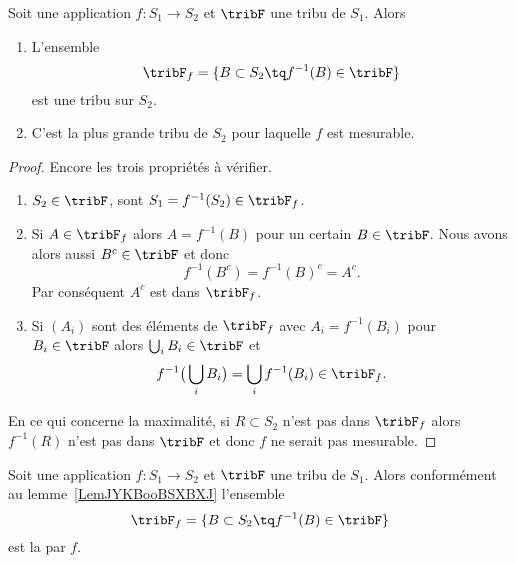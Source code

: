 \begin{lemma}       \label{LemJYKBooBSXBXJ}
    Soit une application \( f\colon S_1\to S_2\) et \( \tribF\) une tribu de \( S_1\). Alors
    \begin{enumerate}
        \item
            L'ensemble
            \begin{equation}
                \tribF_f=\{  B\subset S_2\tq f^{-1}(B)\in \tribF  \}
            \end{equation}
            est une tribu sur \( S_2\).
        \item
            C'est la plus grande tribu de \( S_2\) pour laquelle \( f\) est mesurable.
    \end{enumerate}
\end{lemma}

\begin{proof}
    Encore les trois propriétés à vérifier.
    \begin{enumerate}
        \item
            \( S_2\in\tribF\), sont \( S_1=f^{-1}(S_2)\in \tribF_f\).
        \item
            Si \( A\in \tribF_f\) alors \( A=f^{-1}(B)\) pour un certain \( B\in \tribF\). Nous avons alors aussi \( B^c\in \tribF\) et donc
            \begin{equation}
                f^{-1}(B^c)=f^{-1}(B)^c=A^c.
            \end{equation}
            Par conséquent \( A^c\) est dans \( \tribF_f\).
        \item
            Si \( (A_i)\) sont des éléments de \( \tribF_f\) avec \( A_i=f^{-1}(B_i)\) pour \( B_i\in \tribF\) alors \( \bigcup_iB_i\in\tribF\) et
            \begin{equation}
                f^{-1}\big( \bigcup_iB_i \big)=\bigcup_if^{-1}(B_i)\in\tribF_f.
            \end{equation}
    \end{enumerate}
    En ce qui concerne la maximalité, si \( R\subset S_2\) n'est pas dans \( \tribF_f\) alors \( f^{-1}(R)\) n'est pas dans \( \tribF\) et donc \( f\) ne serait pas mesurable.
\end{proof}

\begin{definition}     \label{DefNOJWooLGKhmJ}
    Soit une application \( f\colon S_1\to S_2\) et \( \tribF\) une tribu de \( S_1\). Alors conformément au lemme~\ref{LemJYKBooBSXBXJ} l'ensemble
        \begin{equation}
            \tribF_f=\{  B\subset S_2\tq f^{-1}(B)\in \tribF  \}
        \end{equation}
        est la  par \( f\).
\end{definition}

